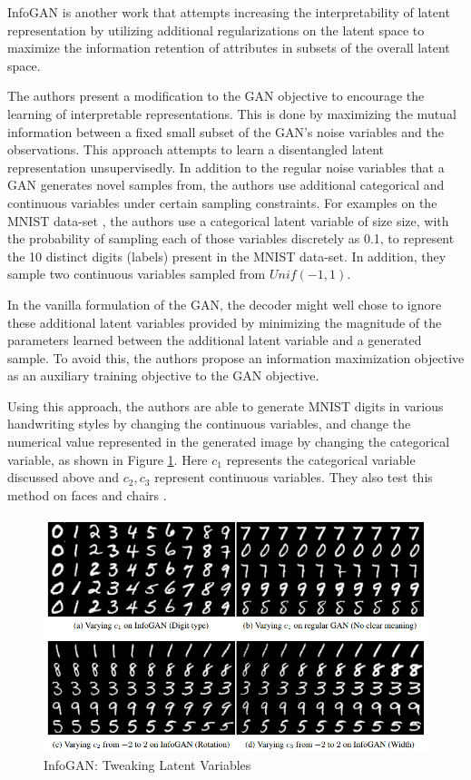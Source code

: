 InfoGAN \citep{chen2016infogan} is another work that attempts increasing the interpretability of latent representation by utilizing additional regularizations on the latent space to maximize the information retention of attributes in subsets of the overall latent space.

The authors present a modification to the GAN objective \citep{goodfellow2014generative} to encourage the learning of interpretable representations. This is done by maximizing the
mutual information between a fixed small subset of the GAN's noise variables and the observations. This approach attempts to learn a disentangled latent representation unsupervisedly. In addition to the regular noise variables that a GAN generates novel samples from, the authors use additional categorical and continuous variables under certain sampling constraints. For examples on the MNIST data-set \citep{lecun2010mnist}, the authors use a categorical latent variable of size size, with the probability of sampling each of those variables discretely as 0.1, to represent the 10 distinct digits (labels) present in the MNIST data-set. In addition, they sample two continuous variables sampled from $Unif(-1, 1)$.

In the vanilla formulation of the GAN, the decoder might well chose to ignore these additional latent variables provided by minimizing the magnitude of the parameters learned between the additional latent variable and a generated sample. To avoid this, the authors propose an information maximization objective as an auxiliary training objective to the GAN objective.

Using this approach, the authors are able to generate MNIST digits in various handwriting styles by changing the continuous variables, and change the numerical value represented in the generated image by changing the categorical variable, as shown in Figure \ref{fig:images/infogan-digits}. Here $c_1$ represents the categorical variable discussed above and $c_2, c_3$ represent continuous variables. They also test this method on faces \citep{liu2015deep,paysan20093d} and chairs \citep{aubry2014seeing}.

\begin{figure}[ht]
	\centering
	\includegraphics[width=\textwidth]{images/infogan-digits}
	\caption{\label{fig:images/infogan-digits} InfoGAN: Tweaking Latent Variables}
\end{figure}

